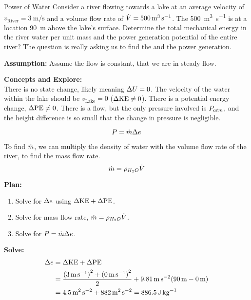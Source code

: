 \begin{example}{Power of Water}
  Consider a river flowing towards a lake at an average velocity of $v_{\mathrm{River}} = \SI{3}{\meter\per\second}$ and a volume flow rate of $\dot{V} = \SI{500}{\cubic\meter\per\second}$.
  The \SI{500}{\cubic\meter\per\second} is at a location \SI{90}{\meter} above the lake's surface.
  Determine the total mechanical energy in the river water per unit mass and the power generation potential of the entire river?
  \tcblower{}
  The question is really asking us to find the  and the power generation.

  \textbf{Assumption:} Assume the flow is constant, that we are in steady flow.

  \textbf{Concepts and Explore:}\\
  There is no state change, likely meaning $\Delta U = 0$.
  The velocity of the water within the lake should be $v_{\mathrm{Lake}} = 0$ ($\Delta \textrm{KE} \neq 0$).
  There is a potential energy change, $\Delta \textrm{PE} \neq 0$.
  There is a flow, but the only pressure involved is $P_{atm}$, and the height difference is so small that the change in pressure is negligible.

  \begin{equation*}
    P = \dot{m} \Delta e
  \end{equation*}

  To find $\dot{m}$, we can multiply the density of water with the volume flow rate of the river, to find the mass flow rate.
  \begin{equation*}
    \dot{m} = \rho_{H_{2}O} \dot{V}
  \end{equation*}

  \textbf{Plan:}
  \begin{enumerate}[noitemsep]
  \item Solve for $\Delta e$ using $\Delta \textrm{KE} + \Delta \textrm{PE}$.
  \item Solve for mass flow rate, $\dot{m} = \rho_{H_{2}O} \dot{V}$.
  \item Solve for $P = \dot{m} \Delta e$.
  \end{enumerate}

  \textbf{Solve:}
  \begin{align*}
    \Delta e &= \Delta \textrm{KE} + \Delta \textrm{PE} \\
                             &= \frac{{(\SI{3}{\meter\per\second})}^{2} + {(\SI{0}{\meter\per\second})}^{2}}{2} + \SI{9.81}{\meter\per\second\squared} (\SI{90}{\meter} - \SI{0}{\meter}) \\
    &= \SI{4.5}{\meter\squared\per\second\squared} + \SI{882}{\meter\squared\per\second\squared} = \SI{886.5}{\joule\per\kilo\gram}
  \end{align*}


\end{example}
